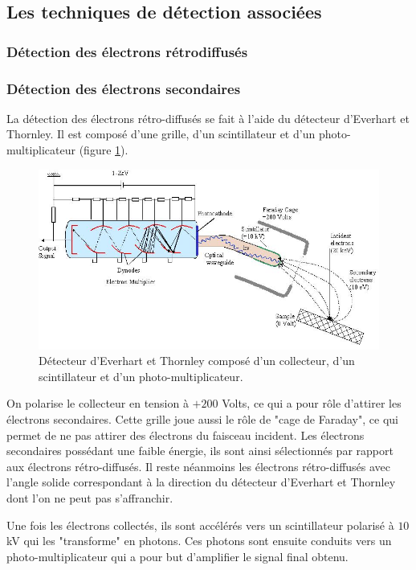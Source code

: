 \documentclass[a4paper,12pt]{article}
\newcommand\ett{Everhart et Thornley\xspace}
\begin{document}
\subsection{Les techniques de détection associées}

\subsubsection*{Détection des électrons rétrodiffusés}

\subsubsection*{Détection des électrons secondaires}

La détection des électrons rétro-diffusés se fait à l'aide du détecteur d'\ett. Il est composé d'une grille, d'un scintillateur et d'un photo-multiplicateur (figure \ref{fig:detect_ett}).

\begin{figure}
\centering
\includegraphics[width = 0.9 \textwidth]{images/detect_ett.png}
\caption{Détecteur d'\ett composé d'un collecteur, d'un scintillateur et d'un photo-multiplicateur.}
\label{fig:detect_ett}
\end{figure}
 
On polarise le collecteur en tension à $+200$ Volts, ce qui a pour rôle d'attirer les électrons secondaires. 
Cette grille joue aussi le rôle de "cage de Faraday", ce qui permet de ne pas attirer des électrons du faisceau incident. 
Les électrons secondaires possédant une faible énergie, ils sont ainsi sélectionnés par rapport aux électrons rétro-diffusés.
Il reste néanmoins les électrons rétro-diffusés avec l'angle solide correspondant à la direction du détecteur d'\ett dont l'on ne peut pas s'affranchir.

Une fois les électrons collectés, ils sont accélérés vers un scintillateur polarisé à $10$kV qui les "transforme" en photons.
Ces photons sont ensuite conduits vers un photo-multiplicateur qui a pour but d'amplifier le signal final obtenu.
\end{document}
